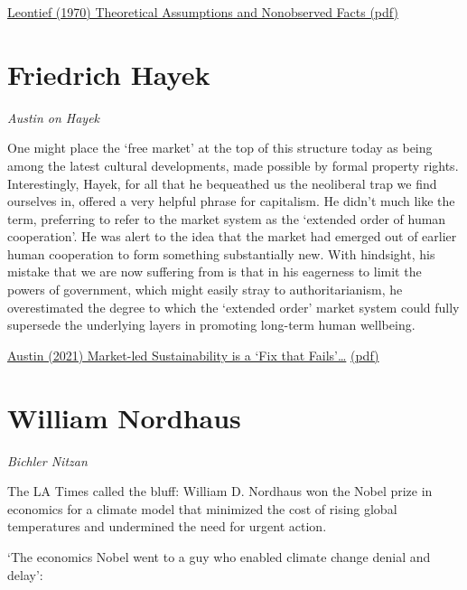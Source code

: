 \documentclass[
]{book}
\begin{document}
\href{pdf/Leontief_1970_Theoretical_Assumptions_and_Nonobserved_Facts.pdf}{Leontief (1970) Theoretical Assumptions and Nonobserved Facts (pdf)}

\hypertarget{friedrich-hayek}{%
\section{Friedrich Hayek}\label{friedrich-hayek}}

\emph{Austin on Hayek}

One might place the `free market' at the top of this structure today as being among the latest cultural
developments, made possible by formal property rights. Interestingly, Hayek, for all that he
bequeathed us the neoliberal trap we find ourselves in, offered a very helpful phrase for capitalism.
He didn't much like the term, preferring to refer to the market system as the `extended order of
human cooperation'. He was alert to the idea that the
market had emerged out of earlier human cooperation to form something substantially new. With
hindsight, his mistake that we are now suffering from is that in his eagerness to limit the powers of
government, which might easily stray to authoritarianism, he overestimated the degree to which the
`extended order' market system could fully supersede the underlying layers in promoting long-term
human wellbeing.

\href{https://bothbrainsrequire\%20d.com/2021/10/25/fix-that-fails/}{Austin (2021) Market-led Sustainability is a `Fix that Fails'\ldots{}}
\href{pdf/Austin_2021_Market_Led_Sustainability_Fix_Fails.pdf}{(pdf)}

\hypertarget{william-nordhaus}{%
\section{William Nordhaus}\label{william-nordhaus}}

\emph{Bichler Nitzan}

The LA Times called the bluff: William D. Nordhaus won the Nobel prize in economics for a climate model that minimized the cost of rising global temperatures and undermined the need for urgent action.

`The economics Nobel went to a guy who enabled climate change denial and delay':
\end{document}
